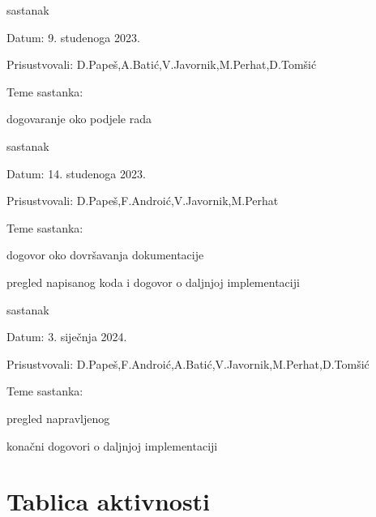 \begin{packed_enum}
			\item  sastanak
			\item[] \begin{packed_item}
				\item Datum: 9. studenoga 2023.
				\item Prisustvovali: D.Papeš,A.Batić,V.Javornik,M.Perhat,D.Tomšić
				\item Teme sastanka:
				\begin{packed_item}
					\item dogovaranje oko podjele rada
				\end{packed_item}
			\end{packed_item}			
			
			\item  sastanak
			\item[] \begin{packed_item}
				\item Datum: 14. studenoga 2023.
				\item Prisustvovali: D.Papeš,F.Androić,V.Javornik,M.Perhat
				\item Teme sastanka:
				\begin{packed_item}
					\item dogovor oko dovršavanja dokumentacije
					\item pregled napisanog koda i dogovor o daljnjoj implementaciji
				\end{packed_item}
			\end{packed_item}	
			
			\item  sastanak
			\item[] \begin{packed_item}
				\item Datum: 3. siječnja 2024.
				\item Prisustvovali: D.Papeš,F.Androić,A.Batić,V.Javornik,M.Perhat,D.Tomšić
				\item Teme sastanka:
				\begin{packed_item}
					\item pregled napravljenog
					\item konačni dogovori o daljnjoj implementaciji
				\end{packed_item}
			\end{packed_item}	
			
			
		\end{packed_enum}
		
		\eject
		\section*{Tablica aktivnosti}

